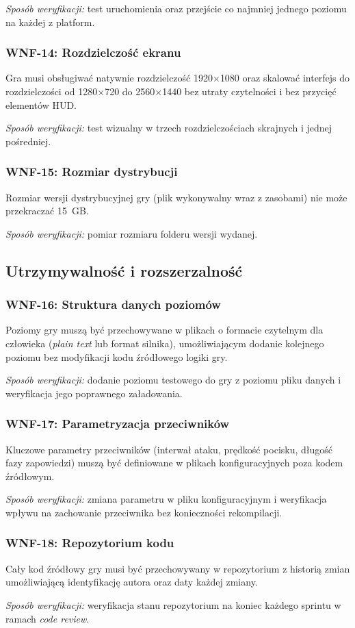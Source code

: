 \textit{Sposób weryfikacji:} test uruchomienia oraz przejście co najmniej jednego poziomu na każdej z platform.

\subsubsection*{WNF-14: Rozdzielczość ekranu}
Gra musi obsługiwać natywnie rozdzielczość 1920$\times$1080 oraz skalować interfejs do rozdzielczości od 1280$\times$720 do 2560$\times$1440 bez utraty czytelności i bez przycięć elementów HUD.

\textit{Sposób weryfikacji:} test wizualny w trzech rozdzielczościach skrajnych i jednej pośredniej.

\subsubsection*{WNF-15: Rozmiar dystrybucji}
Rozmiar wersji dystrybucyjnej gry (plik wykonywalny wraz z zasobami) nie może przekraczać 15~GB.

\textit{Sposób weryfikacji:} pomiar rozmiaru folderu wersji wydanej.

\subsection{Utrzymywalność i rozszerzalność}

\subsubsection*{WNF-16: Struktura danych poziomów}
Poziomy gry muszą być przechowywane w plikach o formacie czytelnym dla człowieka (\textit{plain text} lub format silnika), umożliwiającym dodanie kolejnego poziomu bez modyfikacji kodu źródłowego logiki gry.

\textit{Sposób weryfikacji:} dodanie poziomu testowego do gry z poziomu pliku danych i weryfikacja jego poprawnego załadowania.

\subsubsection*{WNF-17: Parametryzacja przeciwników}
Kluczowe parametry przeciwników (interwał ataku, prędkość pocisku, długość fazy zapowiedzi) muszą być definiowane w plikach konfiguracyjnych poza kodem źródłowym.

\textit{Sposób weryfikacji:} zmiana parametru w pliku konfiguracyjnym i weryfikacja wpływu na zachowanie przeciwnika bez konieczności rekompilacji.

\subsubsection*{WNF-18: Repozytorium kodu}
Cały kod źródłowy gry musi być przechowywany w repozytorium z historią zmian umożliwiającą identyfikację autora oraz daty każdej zmiany.

\textit{Sposób weryfikacji:} weryfikacja stanu repozytorium na koniec każdego sprintu w ramach \textit{code review}.
